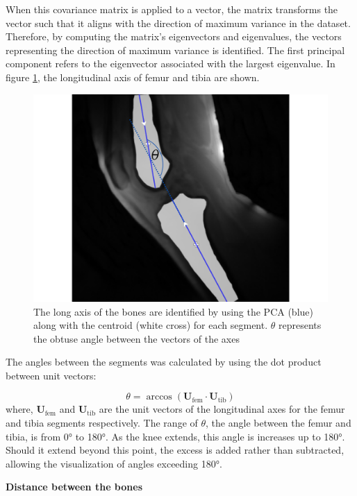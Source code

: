 \documentclass{micro-econ-thesis}
\begin{document}
When this covariance matrix is applied to a vector, the matrix transforms the vector such that it aligns with the direction of maximum variance in the dataset. Therefore, by computing the matrix's eigenvectors and eigenvalues, the vectors representing the direction of maximum variance is identified. The first principal component refers to the eigenvector associated with the largest eigenvalue. In figure \ref{fig:longaxes}, the longitudinal axis of femur and tibia are shown. 

\begin{figure}[H]
	\centering
	\includegraphics[width=0.7\linewidth]{theta_angle_new}
	\caption{The long axis of the bones are identified by using the PCA (blue) along with the centroid (white cross) for each segment. $\theta$ represents the obtuse angle between the vectors of the axes}
	\label{fig:longaxes}
\end{figure}

The angles between the segments was calculated by using the dot product between unit vectors:

\begin{equation}
	\theta = \arccos(\mathbf{U}_{\text{fem}} \cdot \mathbf{U}_{\text{tib}})
	\label{eq:angle}
\end{equation}
where, $\mathbf{U}_{\text{fem}}$ and $\mathbf{U}_{\text{tib}}$ are the unit vectors of the longitudinal axes for the femur and tibia segments respectively. The range of $\theta$, the angle between the femur and tibia, is from 0° to 180°. As the knee extends, this angle is increases up to 180°. Should it extend beyond this point, the excess is added rather than subtracted, allowing the visualization of angles exceeding 180°. 

\textbf{Distance between the bones}
\end{document}
